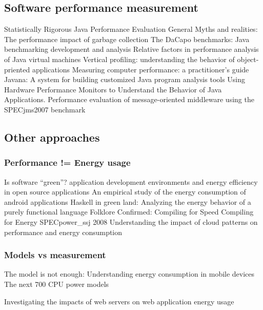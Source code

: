 \subsection{Software performance measurement}

\citep{Georges2007} Statistically Rigorous Java Performance Evaluation General
\citep{Blackburn2004} Myths and realities: The performance impact of garbage collection
\citep{Blackburn2006} The DaCapo benchmarks: Java benchmarking development and analysis
\citep{Gu2006} Relative factors in performance analysis of Java virtual machines
\citep{Hauswirth2004} Vertical profiling: understanding the behavior of object-priented applications
\citep{Lilja2005} Measuring computer performance: a practitioner's guide
\citep{Maebe2006} Javana: A system for building customized Java program analysis tools
\citep{Sweeney2004} Using Hardware Performance Monitors to Understand the Behavior of Java Applications.
\citep{Sachs2009} Performance evaluation of message-oriented middleware using the SPECjms2007 benchmark

\subsection{Other approaches}

\subsubsection{Performance != Energy usage}
\citep{Capra2012} Is software “green”? application development environments and energy efficiency in open source applications
\citep{Li2014b} An empirical study of the energy consumption of android applications
\citep{Lima2016} Haskell in green land: Analyzing the energy behavior of a purely functional language
\citep{Yuki2013} Folklore Confirmed: Compiling for Speed Compiling for Energy
\citep{SPEC2008} SPECpower\_ssj 2008
\citep{Khomh2018} Understanding the impact of cloud patterns on performance and energy consumption


\subsubsection{Models vs measurement}
\citep{Bornholt2012} The model is not enough: Understanding energy consumption in mobile devices
\citep{Colmant2018} The next 700 CPU power models

\citep{Manotas2013} Investigating the impacts of web servers on web application energy usage


